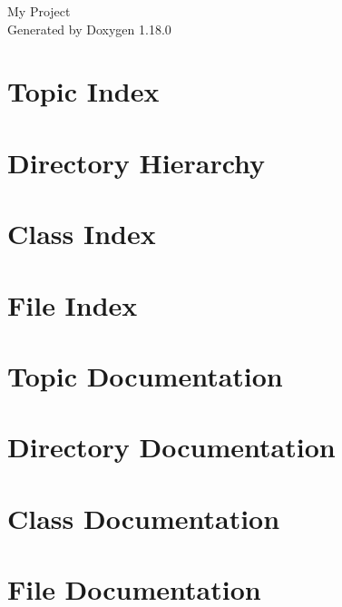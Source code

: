 \documentclass[twoside]{book}
\newcommand{\+}{\discretionary{\mbox{\scriptsize$\hookleftarrow$}}{}{}}
\newcommand{\clearemptydoublepage}{%
    \newpage{\pagestyle{empty}\cleardoublepage}%
  }
\begin{document}
  \raggedbottom
    \hypersetup{pageanchor=false,
                bookmarksnumbered=true,
                pdfencoding=unicode
               }
  \begin{titlepage}
  \vspace*{7cm}
  \begin{center}%
  {\Large My Project}\\
  \vspace*{1cm}
  {\large Generated by Doxygen 1.18.0}\\
  \end{center}
  \end{titlepage}
  \clearemptydoublepage
  \tableofcontents
  \clearemptydoublepage
  \hypersetup{pageanchor=true}
\chapter{Topic Index}

\chapter{Directory Hierarchy}

\chapter{Class Index}

\chapter{File Index}

\chapter{Topic Documentation}

\chapter{Directory Documentation}

\chapter{Class Documentation}

\chapter{File Documentation}

  \backmatter
  \newpage
  \clearemptydoublepage
  \printindex
\end{document}
